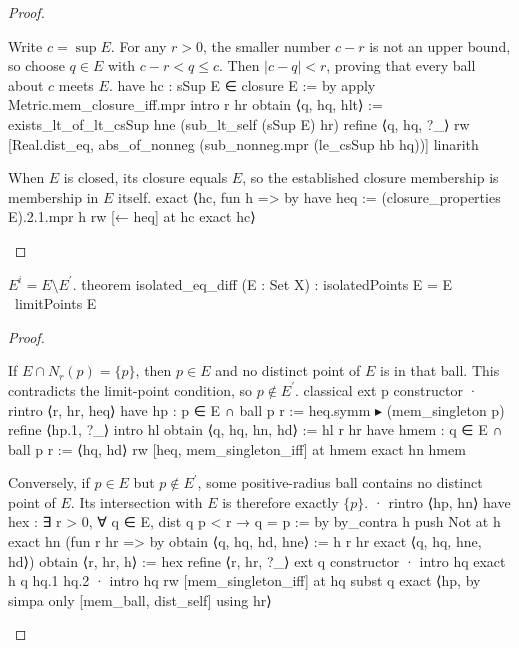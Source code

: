\begin{proof}
  \begin{lean}{Write $c=\sup E$. For any $r>0$, the smaller number $c-r$ is not an upper bound, so choose $q\in E$ with $c-r<q\leq c$. Then $|c-q|<r$, proving that every ball about $c$ meets $E$.}
    have hc : sSup E ∈ closure E := by
      apply Metric.mem_closure_iff.mpr
      intro r hr
      obtain ⟨q, hq, hlt⟩ := exists_lt_of_lt_csSup hne (sub_lt_self (sSup E) hr)
      refine ⟨q, hq, ?_⟩
      rw [Real.dist_eq, abs_of_nonneg (sub_nonneg.mpr (le_csSup hb hq))]
      linarith
  \end{lean}

  \begin{lean}{When $E$ is closed, its closure equals $E$, so the established closure membership is membership in $E$ itself.}
    exact ⟨hc, fun h => by
      have heq := (closure_properties E).2.1.mpr h
      rw [← heq] at hc
      exact hc⟩
  \end{lean}

\end{proof}

\begin{proposition} \label{an1:thm:isolated-points-are-self-minus-limit-points}
  \begin{lean}{$E^{i}=E\setminus E^{\prime}$.}
    theorem isolated_eq_diff (E : Set X) : isolatedPoints E = E \ limitPoints E
  \end{lean}
\end{proposition}

\begin{proof}
  \begin{lean}{If $E\cap N_r(p)=\{p\}$, then $p\in E$ and no distinct point of $E$ is in that ball. This contradicts the limit-point condition, so $p\notin E^{\prime}$.}
    classical
    ext p
    constructor
    · rintro ⟨r, hr, heq⟩
      have hp : p ∈ E ∩ ball p r := heq.symm ▸ (mem_singleton p)
      refine ⟨hp.1, ?_⟩
      intro hl
      obtain ⟨q, hq, hn, hd⟩ := hl r hr
      have hmem : q ∈ E ∩ ball p r := ⟨hq, hd⟩
      rw [heq, mem_singleton_iff] at hmem
      exact hn hmem
  \end{lean}

  \begin{lean}{Conversely, if $p\in E$ but $p\notin E^{\prime}$, some positive-radius ball contains no distinct point of $E$. Its intersection with $E$ is therefore exactly $\{p\}$.}
    · rintro ⟨hp, hn⟩
      have hex : ∃ r > 0, ∀ q ∈ E, dist q p < r → q = p := by
        by_contra h
        push Not at h
        exact hn (fun r hr => by
          obtain ⟨q, hq, hd, hne⟩ := h r hr
          exact ⟨q, hq, hne, hd⟩)
      obtain ⟨r, hr, h⟩ := hex
      refine ⟨r, hr, ?_⟩
      ext q
      constructor
      · intro hq
        exact h q hq.1 hq.2
      · intro hq
        rw [mem_singleton_iff] at hq
        subst q
        exact ⟨hp, by simpa only [mem_ball, dist_self] using hr⟩
  \end{lean}

\end{proof}
